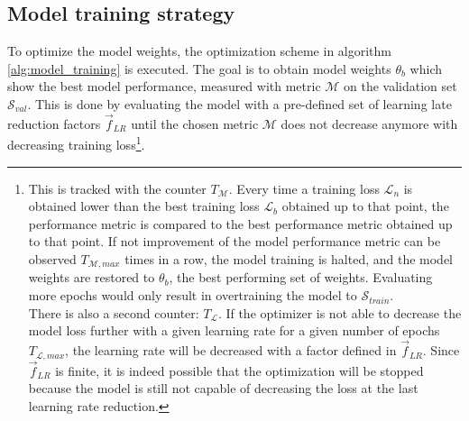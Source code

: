 \subsection{Model training strategy}

To optimize the model weights, the optimization scheme in algorithm \ref{alg:model_training} is executed.
The goal is to obtain model weights $\theta_b$ which show the best model performance, measured with metric $\mathcal{M}$ on the validation set $\mathcal{S}_{val}$.
This is done by evaluating the model with a pre-defined set of learning late reduction factors $\vec{f}_{LR}$ until the chosen metric $\mathcal{M}$ does not decrease anymore with decreasing training loss\footnote{
    This is tracked with the counter $T_\mathcal{M}$. Every time a training loss $\mathcal{L}_n$ is obtained lower than the best training loss $\mathcal{L}_b$ obtained up to that point, 
    the performance metric is compared to the best performance metric obtained up to that point. 
    If not improvement of the model performance metric can be observed $T_{\mathcal{M}, max}$ times in a row, the model training is halted, and the model weights are restored to $\theta_b$, the best performing set of weights.
    Evaluating more epochs would only result in overtraining the model to $\mathcal{S}_{train}$.
    \\[5pt]
    There is also a second counter: $T_\mathcal{L}$. If the optimizer is not able to decrease the model loss further with a given learning rate for a given number of epochs $T_{\mathcal{L}, max}$, the learning rate will be decreased with a factor defined in $\vec{f}_{LR}$.
    Since $\vec{f}_{LR}$ is finite, it is indeed possible that the optimization will be stopped because the model is still not capable of decreasing the loss at the last learning rate reduction.
}.


